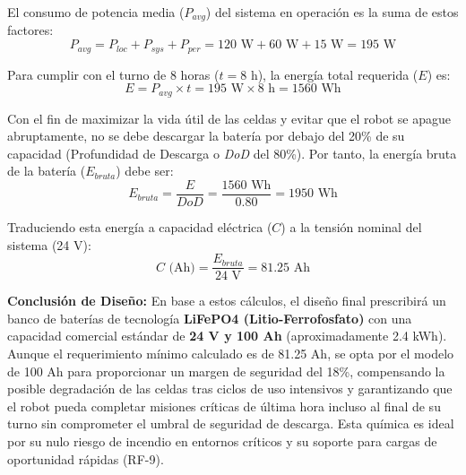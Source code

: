 El consumo de potencia media ($P_{avg}$) del sistema en operación es la suma de estos factores:
\begin{equation}
	P_{avg} = P_{loc} + P_{sys} + P_{per} = 120 \text{ W} + 60 \text{ W} + 15 \text{ W} = 195 \text{ W}
\end{equation}

Para cumplir con el turno de 8 horas ($t = 8$ h), la energía total requerida ($E$) es:
\begin{equation}
	E = P_{avg} \times t = 195 \text{ W} \times 8 \text{ h} = 1560 \text{ Wh}
\end{equation}

Con el fin de maximizar la vida útil de las celdas y evitar que el robot se apague abruptamente, no se debe descargar la batería por debajo del 20\% de su capacidad (Profundidad de Descarga o \textit{DoD} del 80\%). Por tanto, la energía bruta de la batería ($E_{bruta}$) debe ser:
\begin{equation}
	E_{bruta} = \frac{E}{DoD} = \frac{1560 \text{ Wh}}{0.80} = 1950 \text{ Wh}
\end{equation}

Traduciendo esta energía a capacidad eléctrica ($C$) a la tensión nominal del sistema (24 V):
\begin{equation}
	C \text{ (Ah)} = \frac{E_{bruta}}{24 \text{ V}} = 81.25 \text{ Ah}
\end{equation}

\textbf{Conclusión de Diseño:} En base a estos cálculos, el diseño final prescribirá un banco de baterías de tecnología \textbf{LiFePO4 (Litio-Ferrofosfato)} con una capacidad comercial estándar de \textbf{24 V y 100 Ah} (aproximadamente 2.4 kWh). Aunque el requerimiento mínimo calculado es de 81.25 Ah, se opta por el modelo de 100 Ah para proporcionar un margen de seguridad del 18\%, compensando la posible degradación de las celdas tras ciclos de uso intensivos y garantizando que el robot pueda completar misiones críticas de última hora incluso al final de su turno sin comprometer el umbral de seguridad de descarga. Esta química es ideal por su nulo riesgo de incendio en entornos críticos y su soporte para cargas de oportunidad rápidas (RF-9).
